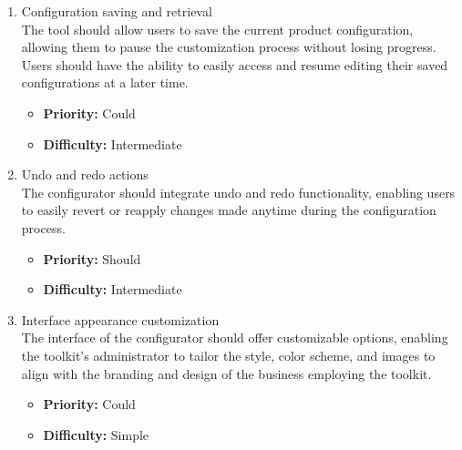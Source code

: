 \begin{enumerate}[label=\textbf{F\arabic*:}, leftmargin=30pt]
\item \label{itm:F12} Configuration saving and retrieval
\vspace{2pt}
\\The tool should allow users to save the current product configuration, allowing them to pause the customization process without losing progress. Users should have the ability to easily access and resume editing their saved configurations at a later time.
\begin{itemize}[noitemsep, label=\trianglebullet]
   \item \textbf{Priority:} Could
    \item \textbf{Difficulty:} Intermediate
\end{itemize}
\vspace{4pt}

\item \label{itm:F13} Undo and redo actions
\vspace{2pt}
\\The configurator should integrate undo and redo functionality, enabling users to easily revert or reapply changes made anytime during the configuration process.
\begin{itemize}[noitemsep, label=\trianglebullet]
    \item \textbf{Priority:} Should
    \item \textbf{Difficulty:} Intermediate
\end{itemize}
\vspace{4pt}

\item \label{itm:F14} Interface appearance customization
\vspace{2pt}
\\The interface of the configurator should offer customizable options, enabling the toolkit's administrator to tailor the style, color scheme, and images to align with the branding and design of the business employing the toolkit.
\begin{itemize}[noitemsep, label=\trianglebullet]
    \item \textbf{Priority:} Could
    \item \textbf{Difficulty:} Simple
\end{itemize}
\vspace{4pt}


\end{enumerate}
